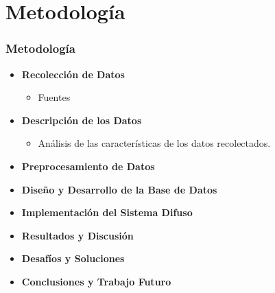 \documentclass{beamer}
\newcommand{\slideauthor}[1]{\gdef\insertslideauthor{#1}}
\begin{document}
\section{Metodología}
\begin{frame}
\frametitle{Metodología}
\slideauthor{Diego Fogued}
\begin{itemize}
    \item \textbf{Recolección de Datos}
    \begin{itemize}
        \item Fuentes
    \end{itemize}
    \item \textbf{Descripción de los Datos}
    \begin{itemize}
        \item Análisis de las características de los datos recolectados.
    \end{itemize}
    \item \textbf{Preprocesamiento de Datos}
    \item \textbf{Diseño y Desarrollo de la Base de Datos}
    \item \textbf{Implementación del Sistema Difuso}
    \item \textbf{Resultados y Discusión}
    \item \textbf{Desafíos y Soluciones}
    \item \textbf{Conclusiones y Trabajo Futuro}

\end{itemize}
\end{frame}
\end{document}
